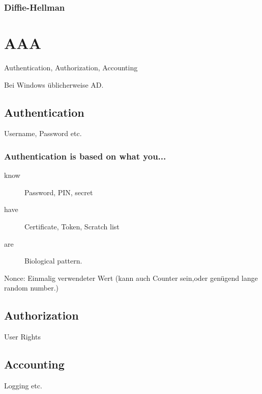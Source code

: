 \subsubsection{Diffie-Hellman}


\section{AAA}

Authentication, Authorization, Accounting

Bei Windows üblicherweise AD.

\subsection{Authentication}
Username, Password etc.

\subsubsection{Authentication is based on what you...}
\begin{description}
	\item[know]	Password, PIN, secret
	\item[have]	Certificate, Token, Scratch list
	\item[are]	Biological pattern.
\end{description}

Nonce: Einmalig verwendeter Wert (kann auch Counter sein,oder genügend lange random number.)

\subsection{Authorization}
User Rights


\subsection{Accounting}
Logging etc.



